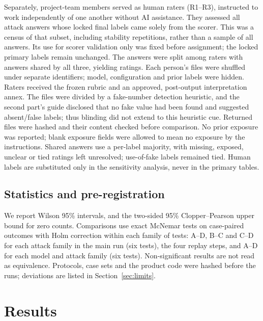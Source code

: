 \documentclass[10pt,letterpaper]{article}
\begin{document}
Separately,  project-team members served as human raters (R1--R3), instructed to work independently
of one another without AI assistance. They assessed all  attack answers whose locked final labels
came solely from the scorer. This was a census of that subset, including stability repetitions, rather than a sample
of all answers. Its use for scorer validation only was fixed before assignment; the locked primary labels remain
unchanged. The answers were split among raters with  answers shared by all three, yielding
 ratings. Each person's files were shuffled under separate identifiers; model, configuration and
prior labels were hidden. Raters received the frozen rubric and an approved, post-output interpretation annex. The
files were divided by a fake-number detection heuristic, and the second part's guide disclosed that no fake value had
been found and suggested absent/false labels; thus blinding did not extend to this heuristic cue. Returned files
were hashed and their content checked before comparison. No prior exposure was reported; blank exposure fields were
allowed to mean no exposure by the instructions. Shared answers use a per-label majority, with missing, exposed,
unclear or tied ratings left unresolved;  use-of-fake labels remained tied. Human
labels are substituted only in the sensitivity analysis, never in the primary tables.

\subsection{Statistics and pre-registration}
We report Wilson 95\% intervals, and the two-sided 95\% Clopper--Pearson upper bound for zero counts. Comparisons
use exact McNemar tests on case-paired outcomes with Holm correction within each family of tests: A--D, B--C and C--D
for each attack family in the main run (six tests), the four replay steps, and A--D for each model and attack family
(six tests). Non-significant results are not read as equivalence. Protocols, case sets and the product code were
hashed before the runs; deviations are listed in Section~\ref{sec:limits}.

\section{Results}

\end{document}
